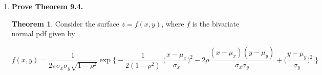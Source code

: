 \documentclass[10pt, oneside]{article}   	%
\theoremstyle{definition}
\newtheorem*{thm}{Theorem}
\begin{document}
\begin{enumerate}[label=9.\arabic*]
\begin{proof}
Now, the inner bracketed term of the argument of the exponential function can be rewritten as

\begin{align*}
\frac{(x-\mu_x)^2}{\sigma^2_x}  - 2\rho \frac{(x-\mu_x)(y-\mu_y)}{\sigma_x \sigma_y} + \rho^2 \frac{(y - \mu_y)^2}{\sigma^2_y} &= \frac{ (x-\mu_x)^2  - \frac{ 2\rho \sigma_x (x-\mu_x)(y-\mu_y)}{\sigma_y} + \frac{ \rho^2 \sigma^2_x (y - \mu_y)^2}{\sigma^2_y} }{ \sigma^2_x } \\
&= \frac{ \big[ (x-\mu_x) - \rho \frac{\sigma_x}{\sigma_y} (y - \mu_y) \big]^2 }{\sigma^2_x} \\
&= \frac{ \big[ x- (\mu_x + \rho \frac{\sigma_x}{\sigma_y} (y - \mu_y) ) \big]^2 }{\sigma^2_x} 
\end{align*}

Therefore we conclude with

\[ \boxed{ g(x|y) = \frac{1}{\sqrt{2\pi} \sigma_x \sqrt{1-\rho^2}} \exp \bigg\{ -\frac{1}{2} \frac{[x-(\mu_x + \rho \frac{\sigma_x}{\sigma_y} (y-\mu_y))]^2}{\sigma^2_x (1-\rho^2)} \bigg\}, \quad -\infty < x,y < +\infty } \]

which has distribution $\boxed{ N\bigg[ \mu_x + \rho \frac{\sigma_x}{\sigma_y} (y-\mu_y), \sigma^2_x (1-\rho^2) \bigg] }$. Simply switch $x$ for $y$ to get

\[ \boxed{ h(y|x) = \frac{1}{\sqrt{2\pi} \sigma_y \sqrt{1-\rho^2}} \exp \bigg\{ -\frac{1}{2} \frac{[y-(\mu_y + \rho \frac{\sigma_y}{\sigma_x} (x-\mu_x))]^2}{\sigma^2_y (1-\rho^2)} \bigg\}, \quad -\infty < x,y < +\infty } \]

which has distribution $\boxed{ N\bigg[ \mu_y + \rho \frac{\sigma_y}{\sigma_x} (x-\mu_x), \sigma^2_y (1-\rho^2) \bigg] }$.

\end{proof}

\item  \begin{tcolorbox}[
  colback=Cerulean!5!white,
  colframe=Cerulean!75!black]
\textbf{Prove Theorem 9.4.}
\end{tcolorbox}

\begin{thm}
Consider the surface $z = f(x,y)$, where $f$ is the bivariate normal pdf given by

\[ f(x,y) = \frac{1}{2\pi \sigma_x \sigma_y \sqrt{1-\rho^2}} \exp \bigg\{ -\frac{1}{2(1-\rho^2)} \bigg[ \bigg( \frac{x - \mu_x}{\sigma_x} \bigg)^2 - 2\rho \frac{(x - \mu_x)(y - \mu_y)}{\sigma_x \sigma_y} + \bigg( \frac{y - \mu_y}{\sigma_y} \bigg)^2 \bigg] \bigg\}  \]


\end{thm}
\end{enumerate}
\end{document}
